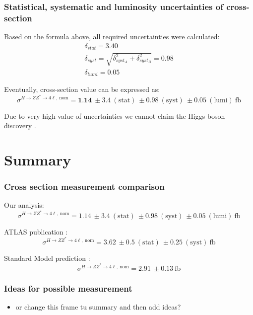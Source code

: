 \documentclass[aspectratio=1610, english]{beamer}
\newcommand{\hzz}{ H\rightarrow ZZ^{*}\rightarrow 4 \ell}
\begin{document}
\begin{frame}
\frametitle{Statistical, systematic and luminosity uncertainties of cross-section}
Based on the formula above, all required uncertainties were calculated:
\begin{eqnarray}
    \delta_{stat}=3.40 \nonumber \\
    \delta_{syst}=\sqrt{\delta_{syst_A}^2 +\delta_{syst_B}^2}=0.98 \nonumber \\
    \delta_{lumi}=0.05 \nonumber
\end{eqnarray}

Eventually, cross-section value can be expressed as: 
\begin{equation}
\sigma^{\hzz, \: \mathrm{nom}}=\textbf{1.14} \: \pm 3.4 \: \mathrm{(stat)} \: \pm 0.98 \: \mathrm{(syst)} \: \pm 0.05 \: \mathrm{(lumi) \: fb}
\end{equation}

Due to very high value of uncertainties we cannot claim the Higgs boson discovery \frownie .
\end{frame}

\section{Summary}

\begin{frame}
\frametitle{Cross section measurement comparison}

Our analysis:
\begin{equation}
\sigma^{\hzz, \: \mathrm{nom}}=1.14 \: \pm 3.4 \: \mathrm{(stat)} \: \pm 0.98 \: \mathrm{(syst)} \: \pm 0.05 \: \mathrm{(lumi) \: fb}
\end{equation}

ATLAS publication \cite{hzz}:
\begin{equation}
\sigma^{\hzz, \: \mathrm{nom}}=3.62 \: \pm 0.5 \: \mathrm{(stat)} \: \pm 0.25 \: \mathrm{(syst)} \: \mathrm{fb}
\end{equation}

Standard Model prediction \cite{hzz}:
\begin{equation}
\sigma^{\hzz, \: \mathrm{nom}}=2.91 \: \pm 0.13  \: \mathrm{fb}
\end{equation}

\end{frame}

\begin{frame}

\frametitle{Ideas for possible measurement}
\begin{itemize}
\item or change this frame tu summary and then add ideas?
\end{itemize}

\end{frame}
\end{document}
